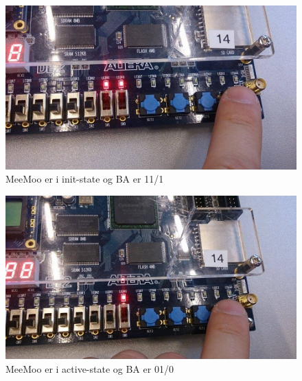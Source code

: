 \begin{enumerate}
\begin{figure}[h]
	\centering
	\includegraphics[scale=0.45]{pictures/Oevelse7/opg1/BA111MooMeeINIT.JPG}
	\caption{MeeMoo er i init-state og BA er 11/1}
	\label{fig:BA111MooMeeINIT}
\end{figure}


\begin{figure}[h]
	\centering
	\includegraphics[scale=0.45]{pictures/Oevelse7/opg1/BA010MooMeeACTIVE.JPG}
	\caption{MeeMoo er i active-state og BA er 01/0}
	\label{fig:BA010MooMeeACTIVE}
\end{figure}

\end{enumerate}
	